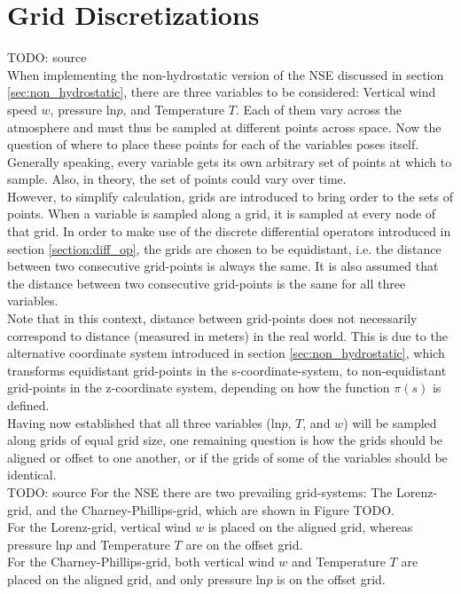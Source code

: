 \section{Grid Discretizations}
TODO: source\\
When implementing the non-hydrostatic version of the NSE discussed in section \ref{sec:non_hydrostatic}, there are three variables to be considered: Vertical wind speed $w$, pressure $\text{ln}p$, and Temperature $T$.
Each of them vary across the atmosphere and must thus be sampled at different points across space.
Now the question of where to place these points for each of the variables poses itself.\\
Generally speaking, every variable gets its own arbitrary set of points at which to sample.
Also, in theory, the set of points could vary over time.\\
However, to simplify calculation, grids are introduced to bring order to the sets of points.
When a variable is sampled along a grid, it is sampled at every node of that grid.
In order to make use of the discrete differential operators introduced in section \ref{section:diff_op}, the grids are chosen to be equidistant, i.e. the distance between two consecutive grid-points is always the same.
It is also assumed that the distance between two consecutive grid-points is the same for all three variables.\\
Note that in this context, distance between grid-points does not necessarily correspond to distance (measured in meters) in the real world.
This is due to the alternative coordinate system introduced in section \ref{sec:non_hydrostatic}, which transforms equidistant grid-points in the s-coordinate-system, to non-equidistant grid-points in the z-coordinate system, depending on how the function $\pi(s)$ is defined.
\\
Having now established that all three variables ($\text{ln}p$, $T$, and $w$) will be sampled along grids of equal grid size, one remaining question is how the grids should be aligned or offset to one another, or if the grids of some of the variables should be identical.\\
TODO: source
For the NSE there are two prevailing grid-systems: The Lorenz-grid, and the Charney-Phillips-grid, which are shown in Figure TODO.\\
For the Lorenz-grid, vertical wind $w$ is placed on the aligned grid, whereas pressure $\text{ln}p$ and Temperature $T$ are on the offset grid.\\
For the Charney-Phillips-grid, both vertical wind $w$ and Temperature $T$ are placed on the aligned grid, and only pressure $\text{ln}p$ is on the offset grid.\\
